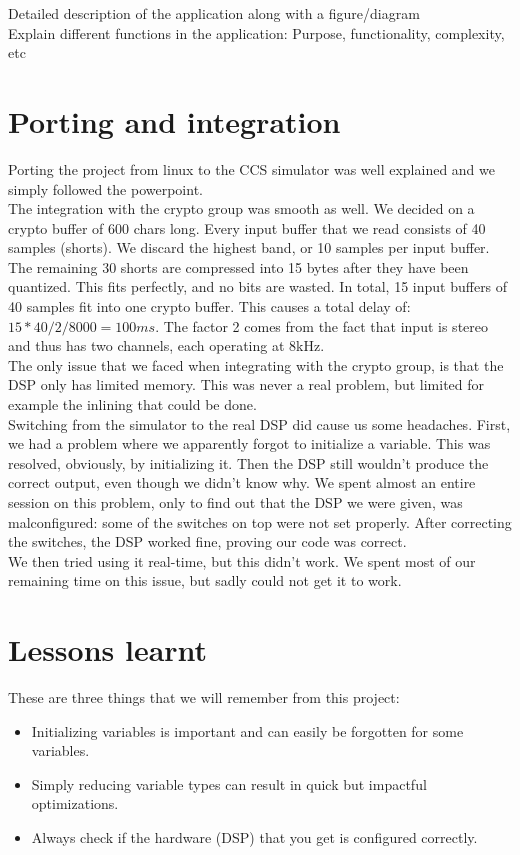 \documentclass[a4paper]{article}
\begin{document}
Detailed description of the application along with a figure/diagram \\
Explain different functions in the application: Purpose, functionality, complexity, etc



\section{Porting and integration}
Porting the project from linux to the CCS simulator was well explained and we simply followed the powerpoint. \\
The integration with the crypto group was smooth as well. We decided on a crypto buffer of 600 chars long. Every input buffer that we read consists of 40 samples (shorts). We discard the highest band, or 10 samples per input buffer. The remaining 30 shorts are compressed into 15 bytes after they have been quantized. This fits perfectly, and no bits are wasted. In total, 15 input buffers of 40 samples fit into one crypto buffer. This causes a total delay of: $15*40/2/8000 = 100ms$. The factor 2 comes from the fact that input is stereo and thus has two channels, each operating at 8kHz. \\
The only issue that we faced when integrating with the crypto group, is that the DSP only has limited memory. This was never a real problem, but limited for example the inlining that could be done. \\
Switching from the simulator to the real DSP did cause us some headaches. First, we had a problem where we apparently forgot to initialize a variable. This was resolved, obviously, by initializing it. Then the DSP still wouldn't produce the correct output, even though we didn't know why. We spent almost an entire session on this problem, only to find out that the DSP we were given, was malconfigured: some of the switches on top were not set properly. After correcting the switches, the DSP worked fine, proving our code was correct. \\
We then tried using it real-time, but this didn't work. We spent most of our remaining time on this issue, but sadly could not get it to work.

\section{Lessons learnt}
These are three things that we will remember from this project:
\begin{itemize}
\item Initializing variables is important and can easily be forgotten for some variables.
\item Simply reducing variable types can result in quick but impactful optimizations.
\item Always check if the hardware (DSP) that you get is configured correctly.
\end{itemize}
\end{document}
